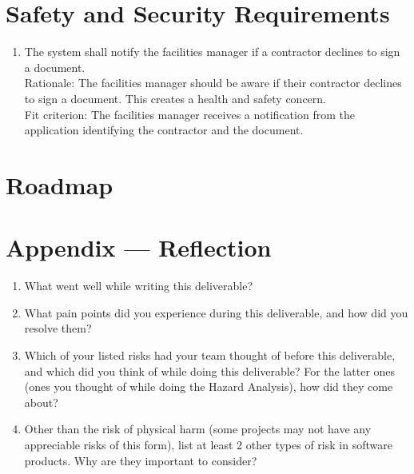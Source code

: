 \documentclass{article}
\begin{document}
\section{Safety and Security Requirements}

\begin{enumerate}[{SFR}1.]
  \item The system shall notify the facilities manager if a contractor declines
    to sign a document.\\
    \newline Rationale: The facilities manager should be aware if
    their contractor
    declines to sign a document. This creates a health and safety concern.\\
    \newline Fit criterion: The facilities manager receives a
    notification from the
    application identifying the contractor and the document.
\end{enumerate}

\section{Roadmap}


\newpage{}

\section*{Appendix --- Reflection}




\begin{enumerate}
  \item What went well while writing this deliverable?
  \item What pain points did you experience during this deliverable, and how
    did you resolve them?
  \item Which of your listed risks had your team thought of before this
    deliverable, and which did you think of while doing this deliverable? For
    the latter ones (ones you thought of while doing the Hazard Analysis), how
    did they come about?
  \item Other than the risk of physical harm (some projects may not have any
    appreciable risks of this form), list at least 2 other types of risk in
    software products. Why are they important to consider?
\end{enumerate}
\end{document}
